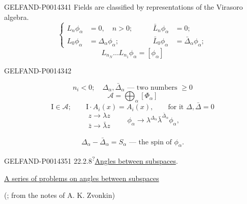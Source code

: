 \begin{GelfandAdjacentEvidence}{GELFAND-P001434}{1}
Fields are classified by representations of the Virasoro algebra.
\begin{equation*}
\tag{26}
\left\{
\begin{aligned}
L_n\phi_\alpha&=0,\quad n>0;&\qquad \bar L_n\phi_\alpha&=0;\\
L_0\phi_\alpha&=\Delta_\alpha\phi_\alpha;&\qquad
\bar L_0\phi_\alpha&=\bar\Delta_\alpha\phi_\alpha;
\end{aligned}
\right.
\end{equation*}
\[
L_{n_N}\ldots L_{n_1}\phi_\alpha=[\phi_\alpha]
\]
\end{GelfandAdjacentEvidence}
\begin{GelfandAdjacentEvidence}{GELFAND-P001434}{2}

\[
n_i<0;\quad\Delta_\alpha,\bar\Delta_\alpha\text{ — two numbers }\geq0
\]
\[
\mathcal A=\bigoplus_\alpha[\Phi_\alpha]
\]
\[
\mathrm I\in\mathcal A;\qquad\mathrm I\cdot A_i(x)=A_i(x),\qquad
\text{for it }\Delta,\bar\Delta=0
\]
\[
\begin{gathered}
z\to\lambda z\\
\bar z\to\bar\lambda z
\end{gathered}
\qquad \phi_\alpha\to\lambda^{\Delta_\alpha}\bar\lambda^{\bar\Delta_\alpha}\phi_\alpha,
\]
\end{GelfandAdjacentEvidence}

\[
\Delta_\alpha-\bar\Delta_\alpha=S_\alpha\text{ — the spin of }\phi_\alpha.
\]


\begin{GelfandAdjacentEvidence}{GELFAND-P001435}{1}
22.2.8\textsuperscript{?}\quad \uline{Angles between subspaces}.
\end{GelfandAdjacentEvidence}


\begin{center}
\uline{A series of problems on angles between subspaces}

(; from the notes of A. K. Zvonkin)
\end{center}

